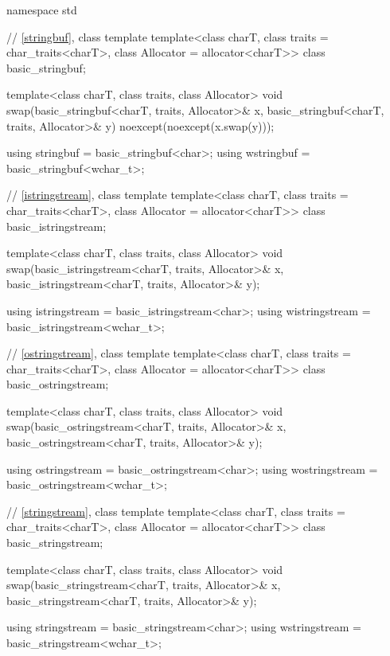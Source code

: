 %
%
%
%
%
%
%
%
%
%
%
%
%
%
%
%
%
\begin{codeblock}
namespace std {
  // \ref{stringbuf}, class template 
  template<class charT, class traits = char_traits<charT>,
           class Allocator = allocator<charT>>
    class basic_stringbuf;

  template<class charT, class traits, class Allocator>
    void swap(basic_stringbuf<charT, traits, Allocator>& x,
              basic_stringbuf<charT, traits, Allocator>& y) noexcept(noexcept(x.swap(y)));

  using stringbuf  = basic_stringbuf<char>;
  using wstringbuf = basic_stringbuf<wchar_t>;

  // \ref{istringstream}, class template 
  template<class charT, class traits = char_traits<charT>,
           class Allocator = allocator<charT>>
    class basic_istringstream;

  template<class charT, class traits, class Allocator>
    void swap(basic_istringstream<charT, traits, Allocator>& x,
              basic_istringstream<charT, traits, Allocator>& y);

  using istringstream  = basic_istringstream<char>;
  using wistringstream = basic_istringstream<wchar_t>;

  // \ref{ostringstream}, class template 
  template<class charT, class traits = char_traits<charT>,
           class Allocator = allocator<charT>>
    class basic_ostringstream;

  template<class charT, class traits, class Allocator>
    void swap(basic_ostringstream<charT, traits, Allocator>& x,
              basic_ostringstream<charT, traits, Allocator>& y);

  using ostringstream  = basic_ostringstream<char>;
  using wostringstream = basic_ostringstream<wchar_t>;

  // \ref{stringstream}, class template 
  template<class charT, class traits = char_traits<charT>,
           class Allocator = allocator<charT>>
    class basic_stringstream;

  template<class charT, class traits, class Allocator>
    void swap(basic_stringstream<charT, traits, Allocator>& x,
              basic_stringstream<charT, traits, Allocator>& y);

  using stringstream  = basic_stringstream<char>;
  using wstringstream = basic_stringstream<wchar_t>;
}
\end{codeblock}

